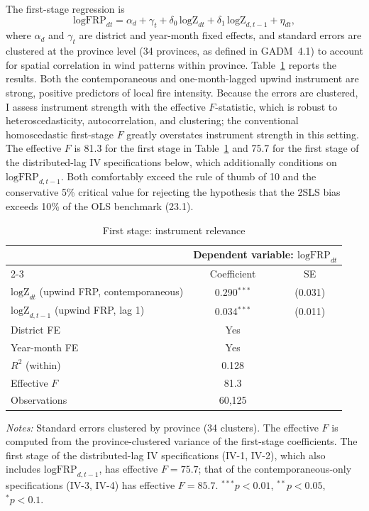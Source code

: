\documentclass[12pt]{article}
\begin{document}
The first-stage regression is
\begin{equation}
\text{logFRP}_{dt} = \alpha_d + \gamma_t + \delta_0\, \text{logZ}_{dt} + \delta_1\, \text{logZ}_{d,t-1} + \eta_{dt},
\label{eq:firststage}
\end{equation}
where $\alpha_d$ and $\gamma_t$ are district and year-month fixed effects, and standard errors are clustered at the province level (34 provinces, as defined in GADM~4.1) to account for spatial correlation in wind patterns within province. Table~\ref{tab:firststage} reports the results. Both the contemporaneous and one-month-lagged upwind instrument are strong, positive predictors of local fire intensity. Because the errors are clustered, I assess instrument strength with the \citet{montielolea2013} effective $F$-statistic, which is robust to heteroscedasticity, autocorrelation, and clustering; the conventional homoscedastic first-stage $F$ greatly overstates instrument strength in this setting. The effective $F$ is 81.3 for the first stage in Table~\ref{tab:firststage} and 75.7 for the first stage of the distributed-lag IV specifications below, which additionally conditions on $\text{logFRP}_{d,t-1}$. Both comfortably exceed the \citet{staigerstock1997} rule of thumb of 10 and the conservative \citet{montielolea2013} 5\% critical value for rejecting the hypothesis that the 2SLS bias exceeds 10\% of the OLS benchmark (23.1).

\begin{table}[H]
\centering
\caption{First stage: instrument relevance}
\label{tab:firststage}
\begin{tabular}{lcc}
\toprule
 & \multicolumn{2}{c}{Dependent variable: $\text{logFRP}_{dt}$} \\
\cmidrule(lr){2-3}
 & Coefficient & SE \\
\midrule
$\text{logZ}_{dt}$ (upwind FRP, contemporaneous) & 0.290$^{***}$ & (0.031) \\
$\text{logZ}_{d,t-1}$ (upwind FRP, lag 1)        & 0.034$^{***}$ & (0.011) \\
\midrule
District FE       & Yes \\
Year-month FE     & Yes \\
$R^2$ (within)     & 0.128 \\
Effective $F$ \citep{montielolea2013} & 81.3 \\
Observations       & 60{,}125 \\
\bottomrule
\end{tabular}
\begin{minipage}{0.85\textwidth}
\vspace{4pt}
\footnotesize \emph{Notes:} Standard errors clustered by province (34 clusters). The effective $F$ is computed from the province-clustered variance of the first-stage coefficients. The first stage of the distributed-lag IV specifications (IV-1, IV-2), which also includes $\text{logFRP}_{d,t-1}$, has effective $F=75.7$; that of the contemporaneous-only specifications (IV-3, IV-4) has effective $F=85.7$. $^{***}p<0.01$, $^{**}p<0.05$, $^{*}p<0.1$.
\end{minipage}
\end{table}
\end{document}
